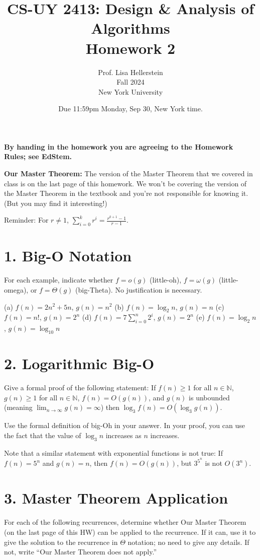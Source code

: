 \documentclass{article}
\title{CS-UY 2413: Design \& Analysis of Algorithms \\ Homework 2}
\author{Prof. Lisa Hellerstein \\ Fall 2024 \\ New York University}
\date{Due 11:59pm Monday, Sep 30, New York time.}
\begin{document}
\maketitle

\textbf{By handing in the homework you are agreeing to the Homework Rules; see EdStem.}

\textbf{Our Master Theorem:} The version of the Master Theorem that we covered in class is on the last page of this homework. We won’t be covering the version of the Master Theorem in the textbook and you’re not responsible for knowing it. (But you may find it interesting!)

Reminder: For $r \neq 1$, $\sum_{i=0}^{k} r^i = \frac{r^{k+1}-1}{r-1}$.

\section*{1. Big-O Notation}

For each example, indicate whether $f = o(g)$ (little-oh), $f = \omega(g)$ (little-omega), or $f = \Theta(g)$ (big-Theta). No justification is necessary.

(a) $f(n) = 2n^2 + 5n$, $g(n) = n^2$
(b) $f(n) = \log_2 n$, $g(n) = n$
(c) $f(n) = n!$, $g(n) = 2^n$
(d) $f(n) = 7 \sum_{i=0}^n 2^i$, $g(n) = 2^n$
(e) $f(n) = \log_2 n$, $g(n) = \log_{10} n$


\section*{2. Logarithmic Big-O}

Give a formal proof of the following statement: If $f(n) \geq 1$ for all $n \in \mathbb{N}$, $g(n) \geq 1$ for all $n \in \mathbb{N}$, $f(n) = O(g(n))$, and $g(n)$ is unbounded (meaning $\lim_{n \to \infty} g(n) = \infty$) then $\log_3 f(n) = O(\log_3 g(n))$.

Use the formal definition of big-Oh in your answer. In your proof, you can use the fact that the value of $\log_3 n$ increases as $n$ increases.

Note that a similar statement with exponential functions is not true: If $f(n) = 5^n$ and $g(n) = n$, then $f(n) = O(g(n))$, but $3^{5^n}$ is not $O(3^n)$.


\section*{3. Master Theorem Application}

For each of the following recurrences, determine whether Our Master Theorem (on the last page of this HW) can be applied to the recurrence. If it can, use it to give the solution to the recurrence in $\Theta$ notation; no need to give any details. If not, write “Our Master Theorem does not apply.”
\end{document}
